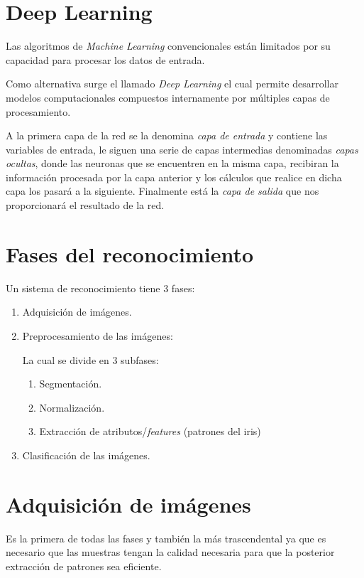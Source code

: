 \section{Deep Learning} \label{deep_learning}
Las algoritmos de \emph{Machine Learning} convencionales están limitados por su capacidad para procesar los datos de entrada.

Como alternativa surge el llamado \emph{Deep Learning} el cual permite desarrollar modelos computacionales compuestos internamente por múltiples capas de procesamiento.


A la primera capa de la red se la denomina \emph{capa de entrada} y contiene las variables de entrada, le siguen una serie de capas intermedias denominadas \emph{capas ocultas}, donde las neuronas que se encuentren en la misma capa, recibiran la información procesada por la capa anterior y los cálculos que realice en dicha capa los pasará a la siguiente.
Finalmente está la \emph{capa de salida} que nos proporcionará el resultado de la red.

\section{Fases del reconocimiento}
Un sistema de reconocimiento tiene 3 fases:
\begin{enumerate}
	\item Adquisición de imágenes.
	\item Preprocesamiento de las imágenes:
	
	La cual se divide en 3 subfases:
	\begin{enumerate}
		\item Segmentación.
		\item Normalización.
		\item Extracción de atributos/\emph{features} (patrones del iris)
	\end{enumerate}
	\item Clasificación de las imágenes.

\end{enumerate}

\section{Adquisición de imágenes} \label{adquisicion_label}
Es la primera de todas las fases y también la más trascendental ya que es necesario que las muestras tengan la calidad necesaria para que la posterior extracción de patrones sea eficiente.


